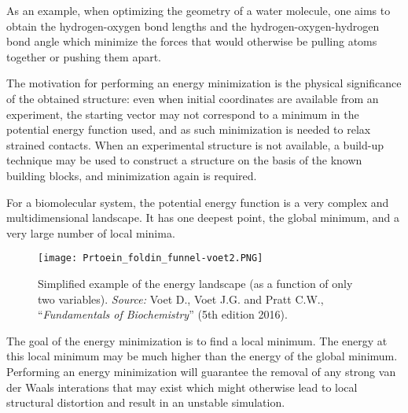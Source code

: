 As an example, when optimizing the geometry of a water molecule, one aims to obtain the hydrogen-oxygen bond lengths and the hydrogen-oxygen-hydrogen bond angle which minimize the forces that would otherwise be pulling atoms together or pushing them apart.

The motivation for performing an energy minimization is the physical significance of the obtained structure: even when initial coordinates are available from an experiment, the starting vector may not correspond to a minimum in the potential energy function used, and as such minimization is needed to relax strained contacts. When an experimental structure is not available, a build-up technique may be used to construct a structure on the basis of the known building blocks, and minimization again is required.

For a biomolecular system, the potential energy function is a very complex and multidimensional landscape. It has one deepest point, the global minimum, and a very large number of local minima. 

\begin{figure}[h]
\centering
\begin{minipage}[t]{0.875\textwidth}
\centering
\texttt{[image: Prtoein\_foldin\_funnel-voet2.PNG]}

\caption{\small{Simplified example of the energy landscape (as a function of only two variables).
	\textit{Source:} Voet D., Voet J.G. and Pratt C.W., ``\textit{Fundamentals of Biochemistry}'' (5th edition 2016)\cite{voet2016fundamentals}.}
}
 
\label{fig:induced-fit}
\end{minipage} 
\end{figure}

The goal of the energy minimization is to find a local minimum. The energy at this local minimum may be much higher than the energy of the global minimum. Performing an energy minimization will guarantee the removal of any strong van der Waals interations that may exist which might otherwise lead to local structural distortion and result in an unstable simulation.


